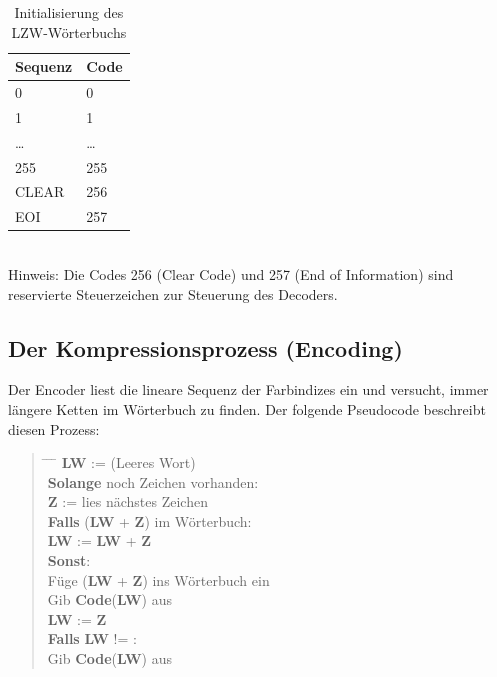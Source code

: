 \documentclass[a4paper,11pt]{scrartcl}
\theoremstyle{definition} %
\begin{document}
\begin{table}[ht]
\begin{center}
\caption{Initialisierung des LZW-Wörterbuchs}
\label{tab:lzw_init}
\begin{tabular}{|l|l|}
\hline
\textbf{Sequenz} & \textbf{Code} \\ \hline
0                & 0             \\ \hline
1                & 1             \\ \hline
\dots            & \dots         \\ \hline
255              & 255           \\ \hline
CLEAR            & 256           \\ \hline
EOI              & 257           \\ \hline
\end{tabular}
\\[1ex]
\small{Hinweis: Die Codes 256 (Clear Code) und 257 (End of Information) sind reservierte Steuerzeichen zur Steuerung des Decoders.}
\end{center}
\end{table}

\subsection{Der Kompressionsprozess (Encoding)}
Der Encoder liest die lineare Sequenz der Farbindizes ein und versucht, immer längere Ketten im Wörterbuch zu finden. Der folgende Pseudocode beschreibt diesen Prozess:

\begin{quote}
\begin{tabbing}
\hspace{0.5cm} \= \hspace{0.5cm} \= \hspace{0.5cm} \= \kill
\textbf{LW} := \texttt{\dq{}\dq{}} \;(Leeres Wort) \\
\textbf{Solange} noch Zeichen vorhanden: \\
\> \textbf{Z} := lies nächstes Zeichen \\
\> \textbf{Falls} (\textbf{LW} + \textbf{Z}) im Wörterbuch: \\
\> \> \textbf{LW} := \textbf{LW} + \textbf{Z} \\
\> \textbf{Sonst}: \\
\> \> Füge (\textbf{LW} + \textbf{Z}) ins Wörterbuch ein \\
\> \> Gib \textbf{Code}(\textbf{LW}) aus \\
\> \> \textbf{LW} := \textbf{Z} \\
\textbf{Falls} \textbf{LW} != \texttt{\dq{}\dq{}}: \\
\> Gib \textbf{Code}(\textbf{LW}) aus
\end{tabbing}
\end{quote}
\end{document}
